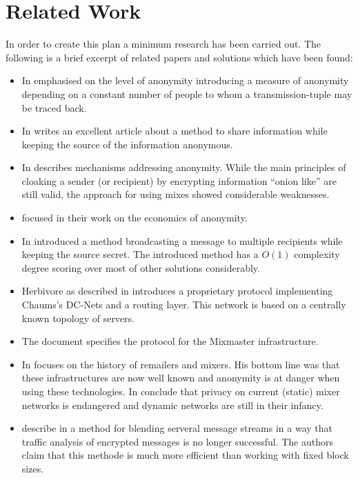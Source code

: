 \documentclass[twocolumn,a4paper,10pt,english]{scrartcl}
\begin{document}
\section{Related Work}
In order to create this plan a minimum research has been carried out. The following is a brief excerpt of related papers and solutions which have been found:
\begin{itemize}
\item In \cite{k-anonymous:ccs2003} \citeauthor{k-anonymous:ccs2003} emphasised on the level of anonymity introducing a measure of anonymity depending on a constant number of people to whom a transmission-tuple may be traced back.
\item In \citeyear{chaum-dc} \citeauthor{chaum-dc} writes an excellent article\cite{chaum-dc} about a method to share information while keeping the source of the information anonymous.
\item In \cite{chaum-mix} \citeauthor{chaum-mix} describes mechanisms addressing anonymity. While the main principles of cloaking a sender (or recipient) by encrypting information ``onion like'' are still valid, the approach for using mixes showed considerable weaknesses.
\item \citeauthor{danezis:weis2006} focused in their work \cite{danezis:weis2006} on the economics of anonymity.
\item In \cite{xor-trees} \citeauthor{xor-trees} introduced a method broadcasting a message to multiple recipients while keeping the source secret. The introduced method has a $O(1)$ complexity degree scoring over most of other solutions considerably.
\item Herbivore as described in \cite{herbivore:tr} introduces a proprietary protocol implementing Chaums's DC-Nets and a routing layer. This network is based on a centrally known topology of servers.
\item The document \cite{mixmaster-spec} specifies the protocol for the Mixmaster infrastructure.
\item In \cite{remailer-history} \citeauthor{remailer-history} focuses on the history of remailers and mixers. His bottom line was that these infrastructures are now well known and anonymity is at danger when using these technologies. In \cite{RP03-1} \citeauthor{RP03-1} conclude that privacy on current (static) mixer networks is endangered and dynamic networks are still in their infancy.
\item \citeauthor{morphmix:wpes2002} describe in \cite{morphmix:wpes2002} a method for blending serveral message streams in a way that traffic analysis of encrypted messages is no longer successful. The authors claim that this methode is much more efficient than working with fixed block sizes.

\end{itemize}
\end{document}
